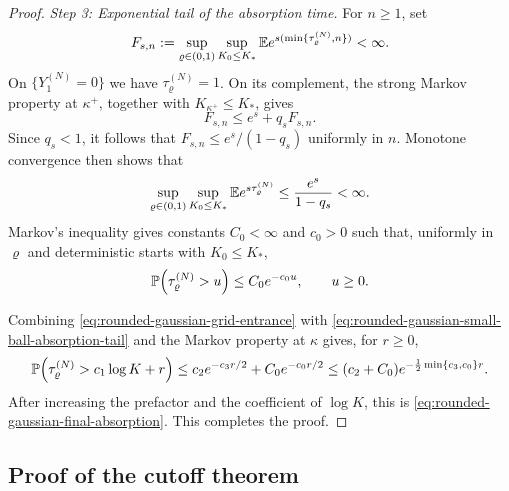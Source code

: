 \documentclass[11pt,reqno,a4paper]{article}
\newcommand{\Pp}{\P}
\newcommand{\Ee}{\E}
\begin{document}
\begin{proof}
  \emph{Step 3: Exponential tail of the absorption time.}
  For $n\geq1$, set
  \begin{equation*}
    F_{s,n}:=
    \sup_{\varrho\in(0,1)}
    \sup_{K_0\leq K_\ast}
    \Ee e^{s(\min\{\tau_\varrho^{(N)}, n\})}<\infty.
  \end{equation*}
  On $\{Y_1^{(N)}=0\}$ we have $\tau_\varrho^{(N)}=1$. On its complement,
  the strong Markov property at $\kappa^+$, together with
  $K_{\kappa^+}\leq K_\ast$, gives
  \begin{equation*}
    F_{s,n}
    \leq
    e^s+q_sF_{s,n}.
  \end{equation*}
  Since $q_s<1$, it follows that $F_{s,n}\leq e^s/(1-q_s)$ uniformly in $n$.
  Monotone convergence then shows that
  \begin{equation*}
    \sup_{\varrho\in(0,1)}
    \sup_{K_0\leq K_\ast}
    \Ee e^{s\tau_\varrho^{(N)}}
    \leq
    \frac{e^s}{1-q_s}<\infty.
  \end{equation*}
  Markov's inequality gives constants $C_0<\infty$ and $c_0>0$ such that,
  uniformly in
  $\varrho$ and deterministic starts with $K_0\leq K_\ast$,
  \begin{equation}\label{eq:rounded-gaussian-small-ball-absorption-tail}
    \Pp\left(\tau_\varrho^{(N)}>u\right)
    \leq
    C_0e^{-c_0u},
    \qquad u\geq0.
  \end{equation}

  Combining \cref{eq:rounded-gaussian-grid-entrance} with
  \cref{eq:rounded-gaussian-small-ball-absorption-tail} and the Markov property
  at $\kappa$ gives, for $r\geq0$,
  \begin{equation*}
    \Pp\left(\tau_\varrho^{(N)}>c_1\log K+r\right)
    \leq
    c_2e^{-c_3r/2}+C_0e^{-c_0r/2}
    \leq
    \left(c_2+C_0\right)e^{-\frac12\min\{c_3,c_0\}r}.
  \end{equation*}
  After increasing the prefactor and the coefficient of $\log K$, this is
  \cref{eq:rounded-gaussian-final-absorption}. This completes the proof.
\end{proof}

\subsection{Proof of the cutoff theorem}
\label{subsec:rounded-gaussian-cutoff-proof}
\end{document}
